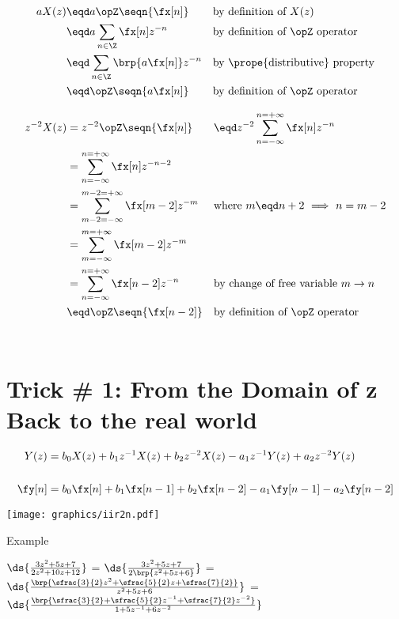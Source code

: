 \begin{align*}
  a X(z)
    &\eqd a \opZ \seqn{\fx[n]}                && \text{by definition of $X(z)$}
  \\&\eqd a \sum_{n\in\Z} \fx[n] z^{-n}       && \text{by definition of $\opZ$ operator}
  \\&\eqd \sum_{n\in\Z} \brp{a \fx[n]} z^{-n} && \text{by \prope{distributive} property}
  \\&\eqd \opZ\seqn{a\fx[n]}                  && \text{by definition of $\opZ$ operator}
\end{align*}




\begin{align*}
  z^{-2}X(z) 
    &= z^{-2} \opZ\seqn{\fx[n]}
   &&\eqd z^{-2}\sum_{n=-\infty}^{n=+\infty} \fx[n] z^{-n}
  \\&=          \sum_{n=-\infty}^{n=+\infty} \fx[n] z^{-n-2}
  \\&=          \sum_{m-2=-\infty}^{m-2=+\infty} \fx[m-2] z^{-m}
    && \text{where $m\eqd n+2$ $\implies$ $n=m-2$}
  \\&=          \sum_{m=-\infty}^{m=+\infty} \fx[m-2] z^{-m}
  \\&=          \sum_{n=-\infty}^{n=+\infty} \fx[n-2] z^{-n}
    && \text{by change of free variable $m\rightarrow n$}
  \\&\eqd \opZ\seqn{\fx[n-2]}
    && \text{by definition of $\opZ$ operator}
\end{align*}
\\



\section*{Trick \# 1: From the Domain of z Back to the real world}

\begin{align*}
  Y(z) &=  b_0X(z) + b_1z^{-1}X(z)  + b_2z^{-2}X(z) - a_1 z^{-1}Y(z) + a_2z^{-2}Y(z)
  \\\\
  \fy[n] &= b_0\fx[n] + b_1\fx[n-1] + b_2\fx[n-2] - a_1\fy[n-1] - a_2\fy[n-2]
\end{align*}

\texttt{[image: graphics/iir2n.pdf]}



Example

$\ds{\frac{3z^2 + 5z + 7}{2z^2 + 10z + 12}}$
=
$\ds{\frac{3z^2 + 5z + 7}{2\brp{z^2 + 5z + 6}}}$
=
$\ds{\frac{\brp{\sfrac{3}{2}z^2 + \sfrac{5}{2}z + \sfrac{7}{2}}}
               {z^2 + 5z + 6}}$
=
$\ds{\frac{\brp{\sfrac{3}{2} + \sfrac{5}{2}z^{-1} + \sfrac{7}{2}z^{-2}}}
               {1 + 5z^{-1} + 6z^{-2}}}$

